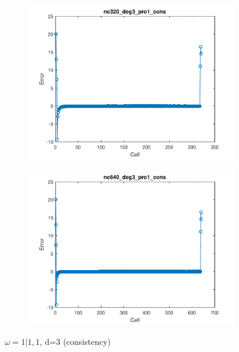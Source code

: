 \documentclass[11pt,a4paper]{article}
\theoremstyle{plain}
\theoremstyle{definition}
\begin{document}
\begin{figure}[H]
\medskip
\begin{subfigure}[b]{0.48\textwidth}
\includegraphics[width=\linewidth]{../../tests_01_01/test_01_01_test48_pro1_cons/output/plots/nc320_deg3_wei111_pro1_cons.pdf}
\end{subfigure}\hspace*{\fill}
\begin{subfigure}[b]{0.48\textwidth}
\includegraphics[width=\linewidth]{../../tests_01_01/test_01_01_test48_pro1_cons/output/plots/nc640_deg3_wei111_pro1_cons.pdf}
\end{subfigure}

\caption{$\omega=1|1,1$, d=3 (consistency)}
\end{figure}
\end{document}
